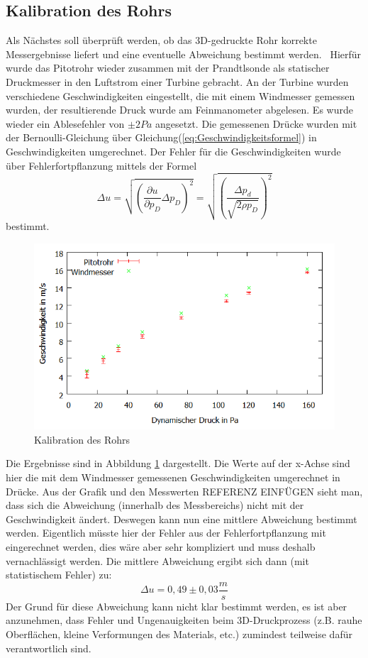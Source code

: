 \subsection{Kalibration des Rohrs}
Als Nächstes soll überprüft werden, ob das 3D-gedruckte Rohr korrekte Messergebnisse liefert und eine eventuelle Abweichung bestimmt werden.
\
Hierfür wurde das Pitotrohr wieder zusammen mit der Prandtlsonde als statischer Druckmesser in den Luftstrom einer Turbine gebracht. An der Turbine wurden verschiedene Geschwindigkeiten eingestellt, die mit einem Windmesser gemessen wurden, der resultierende Druck wurde am Feinmanometer abgelesen. Es wurde wieder ein Ablesefehler von $\pm 2 Pa$ angesetzt. Die gemessenen Drücke wurden mit der Bernoulli-Gleichung über Gleichung(\ref{eq:Geschwindigkeitsformel}) in Geschwindigkeiten umgerechnet.
Der Fehler für die Geschwindigkeiten wurde über Fehlerfortpflanzung mittels der Formel
\begin{equation}
\Delta u=\sqrt{(\frac{\partial u}{\partial p_D}\Delta p_D)^2}=\sqrt{(\frac{\Delta p_d}{\sqrt{2\rho p_D}})^2}
\label{eq:Fehlerfortpflanzung}
\end{equation}
bestimmt.
\begin{figure}
      \includegraphics[width=.9\textwidth]{images/Kalibration}
\caption{Kalibration des Rohrs}
\label{fig:Kalibration}
\end{figure}
Die Ergebnisse sind in Abbildung \ref{fig:Kalibration} dargestellt. Die Werte auf der x-Achse sind hier die mit dem Windmesser gemessenen Geschwindigkeiten umgerechnet in Drücke. Aus der Grafik und den Messwerten REFERENZ EINFÜGEN sieht man, dass sich die Abweichung (innerhalb des Messbereichs) nicht mit der Geschwindigkeit ändert. Deswegen kann nun eine mittlere Abweichung bestimmt werden. Eigentlich müsste hier der Fehler aus der Fehlerfortpflanzung mit eingerechnet werden, dies wäre aber sehr kompliziert und muss deshalb vernachlässigt werden. Die mittlere Abweichung ergibt sich dann (mit statistischem Fehler) zu:
\begin{equation}
\Delta u= 0,49 \pm 0,03 \frac{m}{s}
\label{eq:Abweichung}
\end{equation}
Der Grund für diese Abweichung kann nicht klar bestimmt werden, es ist aber anzunehmen, dass Fehler und Ungenauigkeiten beim 3D-Druckprozess (z.B. rauhe Oberflächen, kleine Verformungen des Materials, etc.) zumindest teilweise dafür verantwortlich sind.
